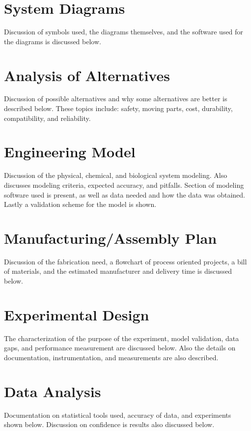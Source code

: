 \documentclass[12pt]{article}
\begin{document}
		\newpage
						
	\section{System Diagrams}
	Discussion of symbols used, the diagrams themselves, and the software used for the diagrams is discussed below.
	
		\newpage				
					
	\section{Analysis of Alternatives}
	Discussion of possible alternatives and why some alternatives are better is described below. These topics include: safety, moving parts, cost, durability, compatibility, and reliability.
	
		\newpage
	
	\section{Engineering Model}
	Discussion of the physical, chemical, and biological system modeling. Also discusses modeling criteria, expected accuracy, and pitfalls. Section of modeling software used is present, as well as data needed and how the data was obtained. Lastly a validation scheme for the model is shown.
	
		\newpage
	
	\section{Manufacturing/Assembly Plan}
	Discussion of the fabrication need, a flowchart of process oriented projects, a bill of materials, and the estimated manufacturer and delivery time is discussed below.
	
		\newpage
	
	\section{Experimental Design}
	The characterization of the purpose of the experiment, model validation, data gaps, and performance measurement are discussed below. Also the details on documentation, instrumentation, and measurements are also described.
		
		\newpage	
	
	\section{Data Analysis}
	Documentation on statistical tools used, accuracy of data, and experiments shown below. Discussion on confidence is results also discussed below.
		
\end{document}
